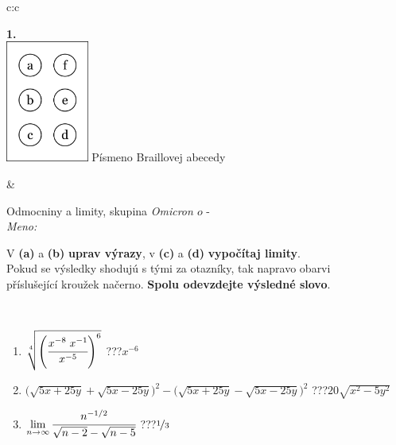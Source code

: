 \documentclass[10pt]{report}
\newcommand\omicron{o}
\begin{document}
\begin{tabular}{c:c}
\begin{minipage}[c][104.5mm][t]{0.5\linewidth}
\begin{center}
\begin{minipage}{0.20\linewidth}
\begin{center}
{\Huge\bfseries 1.} \\[2mm]
\includegraphics[height=40mm]{../images/braille.png}
{\small Písmeno Braillovej abecedy}
\end{center}
\end{minipage}
\end{center}
\end{minipage}
&
\begin{minipage}[c][104.5mm][t]{0.5\linewidth}
\begin{center}
\vspace{7mm}
{\huge Odmocniny a limity, skupina \textit{Omicron $\omicron$} -}\\[5mm]
\textit{Meno:}\phantom{xxxxxxxxxxxxxxxxxxxxxxxxxxxxxxxxxxxxxxxxxxxxxxxxxxxxxxxxxxxxxxxxx}\\[5mm]
\begin{minipage}{0.95\linewidth}
\begin{center}
V \textbf{(a)} a \textbf{(b)} \textbf{uprav výrazy}, v \textbf{(c)} a \textbf{(d)} \textbf{vypočítaj limity}.\\Pokud se výsledky shodujú s tými za otazníky, tak napravo obarvi\\příslušející kroužek načerno. \textbf{Spolu odevzdejte výsledné slovo}.
\end{center}
\end{minipage}
\\[1mm]
\begin{minipage}{0.79\linewidth}
\begin{center}
\begin{varwidth}{\linewidth}
\begin{enumerate}
\small
\item $\sqrt[4]{\left(\cfrac{x^{-8}\;x^{-1}}{x^{-5}}\right)^{6}}$\quad \dotfill\; ???\;\dotfill \quad $x^{-6}$
\item {\footnotesize{\scriptsize$\big(\sqrt{5x+25y}+\sqrt{5x-25y}\big)^2-\big(\sqrt{5x+25y}-\sqrt{5x-25y}\big)^2$}\quad \dotfill\; ???\;\dotfill \quad $20\sqrt{x^2-5y^2}$}
\item $\lim\limits_{n\to\infty}\cfrac{n^{-1/2}}{\sqrt{n-2}-\sqrt{n-5}}$\quad \dotfill\; ???\;\dotfill \quad $\nicefrac{1}{3}$

\end{enumerate}
\end{varwidth}
\end{center}
\end{minipage}
\end{center}
\end{minipage}
\end{tabular}
\end{document}
